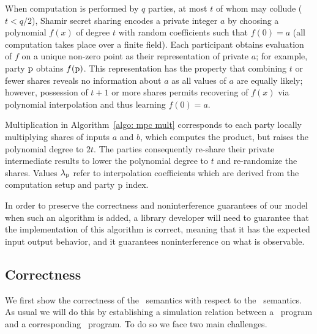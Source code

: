 When computation is performed by $q$ parties, at most $t$ of whom may collude ($t < q/2$), Shamir secret sharing encodes a private integer $a$ by choosing a polynomial $f(x)$ of degree $t$ with random coefficients such that $f(0) = a$ (all computation takes place over a finite field). Each participant obtains evaluation of $f$ on a unique non-zero point as their representation of private $a$; for example, party $\mathrm{{p}}$ obtains $f(\mathrm{{p}})$. This representation has the property that combining $t$ or fewer shares reveals no information about $a$ as all values of $a$ are equally likely; however, possession of $t+1$ or more shares permits recovering of $f(x)$ via polynomial interpolation and thus learning $f(0) = a$. 

Multiplication in Algorithm~\ref{algo: mpc mult} corresponds to each party locally multiplying shares of inputs $a$ and $b$, which computes the product, but raises the polynomial degree to $2t$. The parties consequently re-share their private intermediate results to lower the polynomial degree to $t$ and re-randomize the shares. Values $\lambda_{\mathrm{{p}}}$ refer to interpolation coefficients which are derived from the computation setup and party $\mathrm{{p}}$ index.

In order to preserve the correctness and noninterference guarantees of our
model when such an algorithm is added, a library developer will need
to guarantee that the implementation of this algorithm is correct, meaning that it has the expected input output behavior, and it guarantees noninterference on what is observable. 


\subsection{Correctness} \label{sec: erasure} 
We first show the correctness of the \piccoC\ semantics with respect
to the \vanillaC\ semantics. As usual we will do this by establishing
a simulation relation between a \piccoC\ program and a corresponding
\vanillaC\ program. To do so we face two main challenges.

